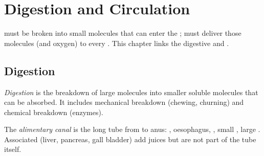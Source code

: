 \chapter{Digestion and Circulation}\label{ch:g7:digestion}

 must be broken into small molecules that can enter the ; 
must deliver those molecules (and oxygen) to every . This chapter
links the digestive and .

\section{Digestion}

\begin{definition}[Digestion]\label{def:g7:digestion:def}
\emph{Digestion} is the breakdown of large  molecules
into smaller soluble molecules that can be absorbed. It includes
mechanical breakdown (chewing, churning) and chemical breakdown (enzymes).
\end{definition}

\begin{definition}\label{def:g7:digestion:canal}
The \emph{alimentary canal} is the long tube from
 to anus: , oesophagus, , small , large
. Associated  (liver, pancreas, gall bladder) add juices
but are not part of the tube itself.
\end{definition}


